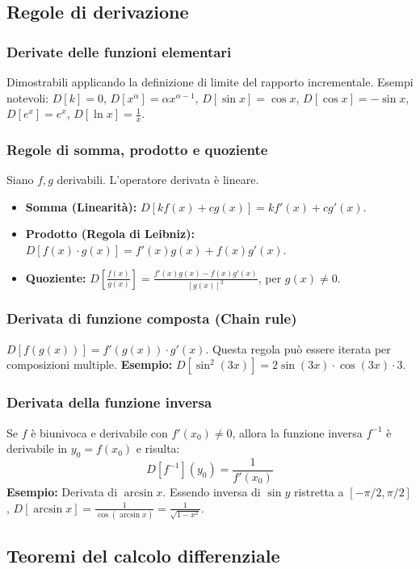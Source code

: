 \subsection{Regole di derivazione}
\subsubsection{Derivate delle funzioni elementari}
Dimostrabili applicando la definizione di limite del rapporto incrementale. Esempi notevoli:
$D[k] = 0$, $D[x^\alpha] = \alpha x^{\alpha-1}$, $D[\sin x] = \cos x$, $D[\cos x] = -\sin x$, $D[e^x] = e^x$, $D[\ln x] = \frac{1}{x}$.

\subsubsection{Regole di somma, prodotto e quoziente}
Siano $f, g$ derivabili. L'operatore derivata è lineare.
\begin{itemize}
    \item \textbf{Somma (Linearità):} $D[kf(x) + cg(x)] = kf'(x) + cg'(x)$.
    \item \textbf{Prodotto (Regola di Leibniz):} $D[f(x) \cdot g(x)] = f'(x)g(x) + f(x)g'(x)$.
    \item \textbf{Quoziente:} $D\left[\frac{f(x)}{g(x)}\right] = \frac{f'(x)g(x) - f(x)g'(x)}{[g(x)]^2}$, per $g(x) \neq 0$.
\end{itemize}

\subsubsection{Derivata di funzione composta (Chain rule)}
$D[f(g(x))] = f'(g(x)) \cdot g'(x)$. Questa regola può essere iterata per composizioni multiple.
\textbf{Esempio:} $D[\sin^2(3x)] = 2\sin(3x) \cdot \cos(3x) \cdot 3$.

\subsubsection{Derivata della funzione inversa}
Se $f$ è biunivoca e derivabile con $f'(x_0) \neq 0$, allora la funzione inversa $f^{-1}$ è derivabile in $y_0 = f(x_0)$ e risulta:
\[ D[f^{-1}](y_0) = \frac{1}{f'(x_0)} \]
\textbf{Esempio:} Derivata di $\arcsin x$. Essendo inversa di $\sin y$ ristretta a $[-\pi/2, \pi/2]$, $D[\arcsin x] = \frac{1}{\cos(\arcsin x)} = \frac{1}{\sqrt{1-x^2}}$.

\subsection{Teoremi del calcolo differenziale}
